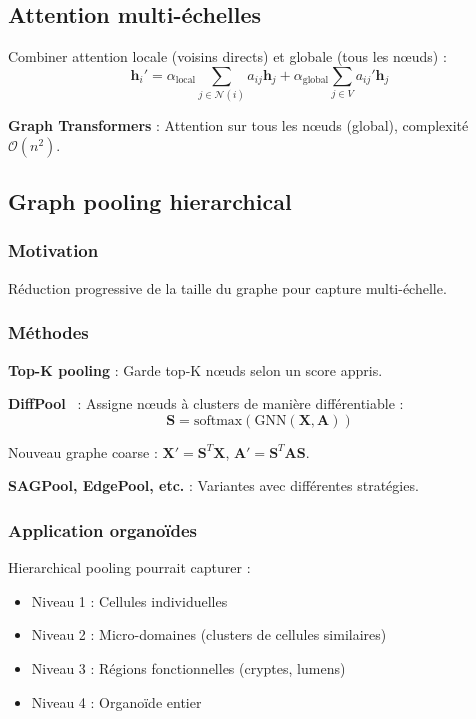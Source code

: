 \subsection{Attention multi-échelles}

Combiner attention locale (voisins directs) et globale (tous les nœuds) :
\[
\mathbf{h}_i' = \alpha_{\text{local}} \sum_{j \in \mathcal{N}(i)} a_{ij} \mathbf{h}_j + \alpha_{\text{global}} \sum_{j \in V} a_{ij}' \mathbf{h}_j
\]

\textbf{Graph Transformers} : Attention sur tous les nœuds (global), complexité $\mathcal{O}(n^2)$.

\subsection{Graph pooling hierarchical}

\subsubsection{Motivation}

Réduction progressive de la taille du graphe pour capture multi-échelle.

\subsubsection{Méthodes}

\textbf{Top-K pooling} : Garde top-K nœuds selon un score appris.

\textbf{DiffPool}~\cite{Ying2018} : Assigne nœuds à clusters de manière différentiable :
\[
\mathbf{S} = \text{softmax}(\text{GNN}(\mathbf{X}, \mathbf{A}))
\]

Nouveau graphe coarse : $\mathbf{X}' = \mathbf{S}^T \mathbf{X}$, $\mathbf{A}' = \mathbf{S}^T \mathbf{A} \mathbf{S}$.

\textbf{SAGPool, EdgePool, etc.} : Variantes avec différentes stratégies.

\subsubsection{Application organoïdes}

Hierarchical pooling pourrait capturer :
\begin{itemize}
    \item Niveau 1 : Cellules individuelles
    \item Niveau 2 : Micro-domaines (clusters de cellules similaires)
    \item Niveau 3 : Régions fonctionnelles (cryptes, lumens)
    \item Niveau 4 : Organoïde entier
\end{itemize}

